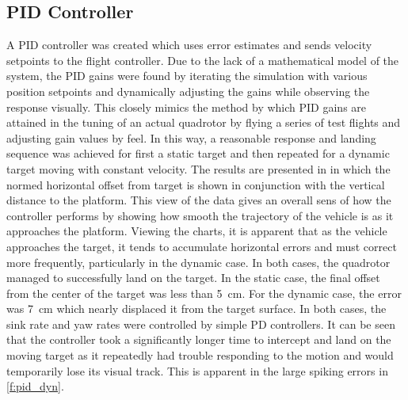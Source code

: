 \subsection{PID Controller}
A PID controller was created which uses error estimates and sends velocity setpoints to the flight controller.
Due to the lack of a mathematical model of the system, the PID gains were found by iterating the simulation
with various position setpoints and dynamically adjusting the gains while observing the response visually.
This closely mimics the method by which PID gains are attained in the tuning of an actual quadrotor by flying
a series of test flights and adjusting gain values by feel. In this way, a reasonable response and landing
sequence was achieved for first a static target and then repeated for a dynamic target moving with constant
velocity. The results are presented in  in which the normed horizontal offset
from target is shown in conjunction with the vertical distance to the platform. This view of the data gives an
overall sens of how the controller performs by showing how smooth the trajectory of the vehicle is as it
approaches the platform.  Viewing the charts, it is
apparent that as the vehicle approaches the target, it tends to accumulate horizontal errors and must correct
more frequently, particularly in the dynamic case. In both cases, the quadrotor managed to successfully land
on the target. In the static case, the final offset from the center of the target was less than \SI{5}{\cm}.
For the dynamic case, the error was \SI{7}{\cm} which nearly displaced it from the target surface. In both
cases, the sink rate and yaw rates were controlled by simple PD controllers. It can be seen that the controller took a significantly longer time to intercept and land
on the moving target as it repeatedly had trouble responding to the motion and would temporarily lose its
visual track. This is apparent in the large spiking errors in \cref{f:pid_dyn}.



